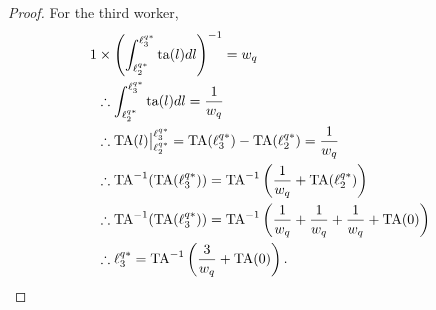 \documentclass[hidelinks, nonatbib]{elsarticle}
\begin{document}
\begin{lemma}
\begin{proof}
        For the third worker,
        \begin{align}
        1 
        &\times 
        \left(
            \int_{\ell_{2}^{q*}}^{\ell_{3}^{q*}}
            \text{ta}(l)
            dl
        \right) ^ {-1}
        =
        w_q
        \\
        &\therefore
        \int_{\ell_{2}^{q*}}^{\ell_{3}^{q*}}
        \text{ta}(l)
        dl
        =
        \frac{1}{w_q}
        \\
        &\therefore
        \text{TA}(l)
        \big|_{\ell_{2}^{q*}}^{\ell_{3}^{q*}}
        =
        \text{TA}(\ell_{3}^{q*})
        -
        \text{TA}(\ell_{2}^{q*})
        =
        \frac{1}{w_q}
        \\
        &\therefore
        \text{TA}^{-1}(
            \text{TA}(\ell_{3}^{q*})
        )
        =
        \text{TA}^{-1}\left(
            \frac{1}{w_q}
            +
            \text{TA}(\ell_{2}^{q*})
        \right)
        \\
        &\therefore
        \text{TA}^{-1}(
            \text{TA}(\ell_{3}^{q*})
        )
        =
        \text{TA}^{-1}\left(
            \frac{1}{w_q}
            +
            \frac{1}{w_q}
            +
            \frac{1}{w_q}
            +
            \text{TA}(0)
        \right)
        \\
        &\therefore
        \ell_{3}^{q*}
        =
        \text{TA}^{-1}\left(
            \frac{3}{w_q}
            +
            \text{TA}(0)
        \right)
        .
        \end{align}
        

\end{proof}
\end{lemma}
\end{document}
